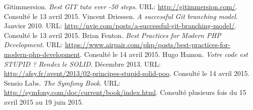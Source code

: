 \begin{thebibliography}{ABC}	
     Gitimmersion. \emph{Best GIT tuto ever -50 steps}. URL: \url{http://gitimmersion.com/}. Consulté le 13 avril 2015.
     Vincent Driessen. \emph{A successful Git branching model}. Janvier 2010. URL: \url{http://nvie.com/posts/a-successful-git-branching-model/}. Consulté le 13 avril 2015.
     Brian Fenton. \emph{Best Practices for Modern PHP Development}. URL: \url{https://www.airpair.com/php/posts/best-practices-for-modern-php-development}. Consulté le 14 avril 2015.
     Hugo Hamon. \emph{Votre code est STUPID ? Rendez le SOLID}. Décembre 2013. URL: \url{http://afsy.fr/avent/2013/02-principes-stupid-solid-poo}. Consulté le 14 avril 2015.
     Sensio Labs. \emph{The Symfony Book}. URL: \url{http://symfony.com/doc/current/book/index.html}. Consulté plusieurs fois du 15 avril 2015 au 19 juin 2015.
\end{thebibliography}
